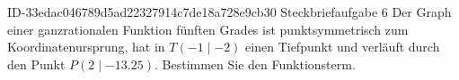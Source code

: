 \begin{exercise}
      {ID-33edac046789d5ad22327914c7de18a728e9cb30}
      {Steckbriefaufgabe 6}
  \ifproblem\problem
    Der Graph einer ganzrationalen Funktion fünften Grades ist
    punktsymmetrisch zum Koordinatenursprung, hat in
    $T(\num{-1}\mid\num{-2})$ einen Tiefpunkt und verläuft durch
    den Punkt $P(\num{2}\mid\num{-13.25})$. Bestimmen Sie den
    Funktionsterm.
  \fi
\end{exercise}

